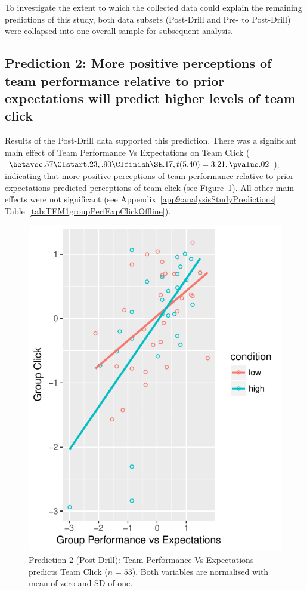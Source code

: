 \begin{CJK}{UTF8}{gbsn}
To investigate the extent to which the collected data could explain the remaining predictions of this study, both data subsets (Post-Drill and Pre- to Post-Drill) were collapsed into one overall sample for subsequent analysis.



\subsection{Prediction 2: More positive perceptions of team performance relative to prior expectations will predict higher levels of team click}

Results of the Post-Drill data supported this prediction. There was a significant main effect of Team Performance Vs Expectations on Team Click ($\betavec .57 \CIstart .23, .90 \CIfinish \SE .17, t(5.40) = 3.21, \pvalue .02$), indicating that more positive perceptions of team performance relative to prior expectations predicted perceptions of team click (see Figure~\ref{fig:teamPerfExpClickScatter}).  All other main effects were not significant (see Appendix~\ref{app9:analysisStudyPredictions} Table~\ref{tab:TEM1groupPerfExpClickOffline}).


\begin{figure}
    \centering
    \includegraphics[width=0.5\linewidth,keepaspectratio] {images/teamPerfExpClickScatter}
    \caption{Prediction 2 (Post-Drill): Team Performance Vs Expectations predicts Team Click ($n = 53$).  Both variables are normalised with mean of zero and SD of one.}
    \label{fig:teamPerfExpClickScatter}
\end{figure}


\end{CJK}
